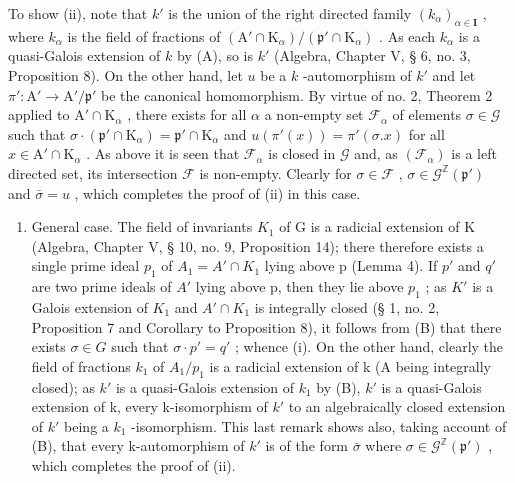 To show (ii), note that \(k'\) is the union of the right directed family \((k_{\alpha})_{\alpha \in \mathbf{I}}\) , where \(k_{\alpha}\) is the field of fractions of \((\mathrm{A}' \cap \mathrm{K}_{\alpha}) / (\mathfrak{p}' \cap \mathrm{K}_{\alpha})\) . As each \(k_{\alpha}\) is a quasi-Galois extension of \(k\) by (A), so is \(k'\) (Algebra, Chapter V, § 6, no. 3, Proposition 8). On the other hand, let \(u\) be a \(k\) -automorphism of \(k'\) and let \(\pi': \mathrm{A}' \to \mathrm{A}' / \mathfrak{p}'\) be the canonical homomorphism. By virtue of no. 2, Theorem 2 applied to \(\mathrm{A}' \cap \mathrm{K}_{\alpha}\) , there exists for all \(\alpha\) a non-empty set \(\mathcal{F}_{\alpha}\) of elements \(\sigma \in \mathcal{G}\) such that \(\sigma \cdot (\mathfrak{p}' \cap \mathrm{K}_{\alpha}) = \mathfrak{p}' \cap \mathrm{K}_{\alpha}\) and \(u(\pi'(x)) = \pi'(\sigma.x)\) for all \(x \in \mathrm{A}' \cap \mathrm{K}_{\alpha}\) . As above it is seen that \(\mathcal{F}_{\alpha}\) is closed in \(\mathcal{G}\) and, as \((\mathcal{F}_{\alpha})\) is a left directed set, its intersection \(\mathcal{F}\) is non-empty. Clearly for \(\sigma \in \mathcal{F}\) , \(\sigma \in \mathcal{G}^{\mathbb{Z}}(\mathfrak{p}')\) and \(\bar{\sigma} = u\) , which completes the proof of (ii) in this case.

\begin{enumerate}
\def\labelenumi{(\Alph{enumi})}
\setcounter{enumi}{2}
\tightlist
\item
  General case. The field of invariants \(K_{1}\) of G is a radicial extension of K (Algebra, Chapter V, § 10, no. 9, Proposition 14); there therefore exists a single prime ideal \(p_{1}\) of \(A_{1} = A' \cap K_{1}\) lying above p (Lemma 4). If \(p'\) and \(q'\) are two prime ideals of \(A'\) lying above p, then they lie above \(p_{1}\) ; as \(K'\) is a Galois extension of \(K_{1}\) and \(A' \cap K_{1}\) is integrally closed (§ 1, no. 2, Proposition 7 and Corollary to Proposition 8), it follows from (B) that there exists \(\sigma \in G\) such that \(\sigma \cdot p' = q'\) ; whence (i). On the other hand, clearly the field of fractions \(k_{1}\) of \(A_{1}/p_{1}\) is a radicial extension of k (A being integrally closed); as \(k'\) is a quasi-Galois extension of \(k_{1}\) by (B), \(k'\) is a quasi-Galois extension of k, every k-isomorphism of \(k'\) to an algebraically closed extension of \(k'\) being a \(k_{1}\) -isomorphism. This last remark shows also, taking account of (B), that every k-automorphism of \(k'\) is of the form \(\bar{\sigma}\) where \(\sigma \in \mathcal{G}^{\mathbb{Z}}(\mathfrak{p}')\) , which completes the proof of (ii).
\end{enumerate}

